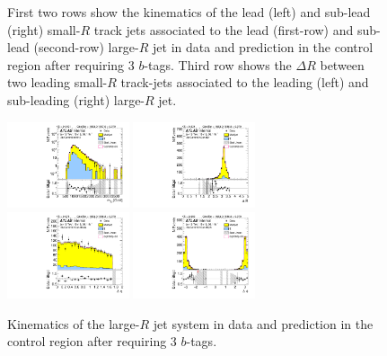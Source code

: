 \begin{figure}[htbp!]
\begin{center}
  \caption{First two rows show the kinematics of the lead (left) and sub-lead (right) small-$R$ track jets associated to the lead (first-row) and sub-lead (second-row) large-$R$ jet in data and prediction in the control region after requiring 3 $b$-tags. Third row shows the $\Delta R$ between two leading small-$R$ track-jets associated to the leading (left) and sub-leading (right) large-$R$ jet.  }
  \label{fig:boosted-3b-control-ak2}
\end{center}
\end{figure}


\begin{figure}[htbp!]
\begin{center}
\includegraphics[width=0.32\textwidth,angle=-90]{figures/boosted/Control/b77_ThreeTag_Control_mHH_l_1.pdf}
\includegraphics[width=0.32\textwidth,angle=-90]{figures/boosted/Control/b77_ThreeTag_Control_hCandDr.pdf}\\
\includegraphics[width=0.32\textwidth,angle=-90]{figures/boosted/Control/b77_ThreeTag_Control_hCandDeta.pdf}
\includegraphics[width=0.32\textwidth,angle=-90]{figures/boosted/Control/b77_ThreeTag_Control_hCandDphi.pdf}
  \caption{Kinematics of the large-$R$ jet system in data and prediction in the control region after requiring 3 $b$-tags.  }
  \label{fig:boosted-3b-control-ak10-system}
\end{center}
\end{figure}

